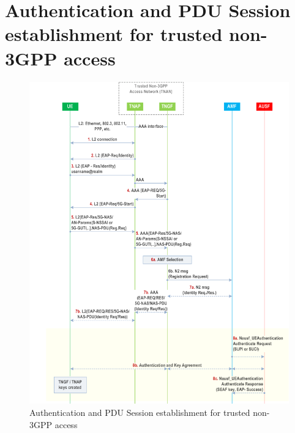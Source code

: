 \chapter{Authentication and \acs{PDU} Session establishment for trusted non-\acs{3GPP} access}
\label{chapter:appendix-c}

\begin{figure}
    \centering
    \includegraphics[width=1\linewidth]{figs/Authentication and PDU Session establishment for trusted non-3GPP access_1.png}
    \caption{Authentication and \acs{PDU} Session establishment for trusted non-\acs{3GPP} access}
    \label{fig:Authentication and PDU Session establishment for trusted non-3GPP access_1}
\end{figure}

